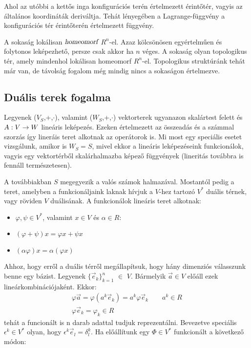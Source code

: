\documentclass[a4paper,12pt]{article}
\begin{document}
\par Ahol az utóbbi a kettős inga konfigurációs terén értelmezett érintőtér, vagyis az általános koordináták deriváltja. Tehát lényegében a Lagrange-függvény a konfigurációs tér érintőterén értelmezett függvény.
\newline
\par A sokaság lokálisan $\textsl{homeomorf}$ $R^{n}$-el. Azaz kölcsönösen egyértelműen és folytonos leképezhető, persze csak akkor ha $n$ véges. A sokaság olyan topologikus tér, amely mindenhol lokálisan homeomorf $R^{n}$-el. Topologikus struktúránk tehát már van, de távolság fogalom még mindig nincs a sokaságon értelmezve.
\subsection{ Duális terek fogalma}
\par Legyenek ($V_S$,+,$\cdot$), valamint ($W_S$,+,$\cdot$) vektorterek ugyanazon skalártest felett és $\textsl{A} : V \rightarrow W$ lineáris leképezés. Ezeken értelmezett az összeadás és a számmal szorzás így lineráis teret alkotnak az operátorok is.  Mi most egy speciális esetet vizsgálunk, amikor is $W_S = S$, mivel ekkor a lineáris leképezéseink funkcionálok, vagyis egy vektortérből skalárhalmazba képező függvények (lineritás továbbra is fennáll természetesen).
\par A továbbiakban $S$ megegyezik a valós számok halmazával. Mostantól pedig a teret, amelyben a funkcionáljaink laknak hívjuk a $V$-hez tartozó $V^{*}$ duális térnek, vagy röviden $V$ duálisának. A funkcionálok lineáris teret alkotnak:
\begin{itemize}
\item $\varphi, \psi \in V^{*}$, valamint $x \in V$ és $\alpha \in R$:
\item $(\varphi + \psi)x = \varphi x + \psi x$
\item $(\alpha \varphi)x = \alpha (\varphi x)$
\end{itemize}
\par Ahhoz, hogy erről a duális térről megállapítsuk, hogy hány dimenziós válasszunk benne egy bázist. Legyenek $\{\vec{e}_{k}\}_{k = 1}^{n}$ $\in$ $V$. Bármelyik $\vec{a} \in V$ előáll ezek lineárkombinációjaként. Ekkor:
\begin{align*}
\varphi\vec{a} = \varphi(a^{k}\vec{e}_{k}) = a^{k}\varphi\vec{e}_{k} \quad  \quad a^{k} \in R \\
\varphi\vec{e}_{k} = \varphi_{k} \in R
\end{align*}
tehát a funcionált is n darab adattal tudjuk reprezentálni. Bevezetve speciális $\epsilon^{k} \in V^{*}$ olyan, hogy $\epsilon^{k}\vec{e}_{l} = \delta_{l}^{k}$. Ha előállítunk egy $\Phi \in V^{*}$ funkcionált a következő módon:
\end{document}

